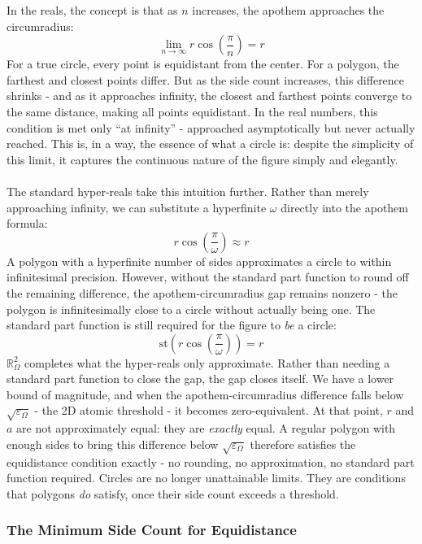 \documentclass{article}
\begin{document}
In the reals, the concept is that as $n$ increases, the apothem approaches 
the circumradius:
$$\lim_{n \to \infty} r\cos\left(\frac{\pi}{n}\right) = r$$For a true circle, every point is equidistant from the center. For a polygon, 
the farthest and closest points differ. But as the side count increases, this 
difference shrinks - and as it approaches infinity, the closest and farthest 
points converge to the same distance, making all points equidistant. In the 
real numbers, this condition is met only ``at infinity'' - approached 
asymptotically but never actually reached. This is, in a way, the essence of 
what a circle is: despite the simplicity of this limit, it captures the 
continuous nature of the figure simply and elegantly.\\\\
The standard hyper-reals take this intuition further. Rather than merely 
approaching infinity, we can substitute a hyperfinite $\omega$ directly into 
the apothem formula:
$$r\cos\left(\frac{\pi}{\omega}\right) \approx r$$
A polygon with a hyperfinite number of sides approximates a circle to within 
infinitesimal precision. However, without the standard part function to round 
off the remaining difference, the apothem-circumradius gap remains nonzero - 
the polygon is infinitesimally close to a circle without actually being 
one.\cite{goldblatt1998hyperreals} The standard part function is 
still required for the figure to \textit{be} a circle:
$$\text{st}\left(r\cos\left(\frac{\pi}{\omega}\right)\right) = r$$ $\mathbb{R}_\Omega^2$ completes what the hyper-reals only approximate. Rather 
than needing a standard part function to close the gap, the gap closes itself. 
We have a lower bound of magnitude, and when the apothem-circumradius difference 
falls below $\sqrt{\varepsilon_\Omega}$ - the 2D atomic threshold - it becomes 
zero-equivalent. At that point, $r$ and $a$ are not approximately equal: they 
are \textit{exactly} equal. A regular polygon with enough sides to bring this 
difference below $\sqrt{\varepsilon_\Omega}$ therefore satisfies the 
equidistance condition exactly - no rounding, no approximation, no standard 
part function required. Circles are no longer unattainable limits. They are 
conditions that polygons \textit{do} satisfy, once their side count exceeds a 
threshold.

\subsubsection{The Minimum Side Count for Equidistance}
\end{document}
